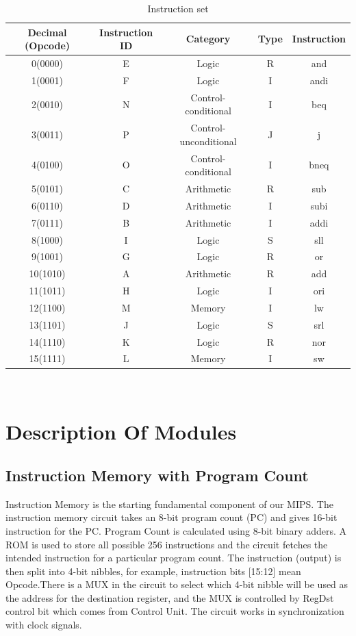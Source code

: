 \documentclass[12]{article}
\begin{document}
\begin{table}[!h]
    \centering
\begin{tabular}{|c|c|c|c|c|}
\hline
Decimal (Opcode) & Instruction ID  & Category  & Type & Instruction \\
\hline
0(0000) & E & Logic & R & and \\
\hline
1(0001) & F & Logic & I & andi \\
\hline
2(0010)& N & Control-conditional & I & beq\\
\hline
3(0011) & P & Control-unconditional & J &  j \\
\hline
4(0100) & O & Control-conditional & I & bneq\\
\hline
5(0101) & C & Arithmetic & R & sub \\
\hline
6(0110) & D & Arithmetic & I & subi\\
\hline
7(0111) & B & Arithmetic & I & addi\\
\hline
8(1000) & I &  Logic & S & sll\\
\hline
9(1001) & G &  Logic & R & or\\
\hline
10(1010) & A & Arithmetic & R & add\\
\hline
11(1011) & H & Logic & I & ori \\
\hline
12(1100) & M & Memory & I & lw\\
\hline
13(1101) & J & Logic & S & srl \\
\hline
14(1110) & K & Logic & R & nor \\
\hline
15(1111) & L & Memory & I & sw \\
\hline

\end{tabular}
    \caption{Instruction set}
    \label{tab:ins_set}
\end{table}

\\



\section{Description Of Modules}
\subsection{Instruction Memory with Program Count}
Instruction Memory is the starting fundamental component of our MIPS. The instruction memory circuit takes an 8-bit program count (PC) and gives 16-bit instruction for the PC. Program Count is calculated using 8-bit binary adders. A ROM is used to store all possible 256 instructions and the circuit fetches the intended instruction for a particular program count. The instruction (output) is then split into 4-bit nibbles, for example, instruction bits [15:12] mean Opcode.There is a MUX in the circuit to select which 4-bit nibble will be used as the address for the destination register, and the MUX is controlled by RegDst control bit which comes from Control Unit. The circuit works in synchronization with clock signals.
\end{document}
